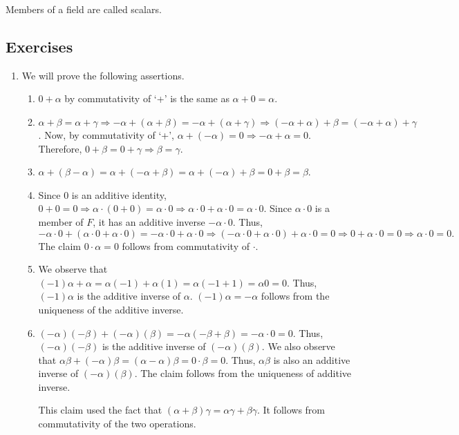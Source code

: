 \begin{rem}
Members of a field are called scalars.
\end{rem}

\subsection{Exercises}
\begin{enumerate}
\item We will prove the following assertions.
\begin{enumerate}
\item $0 + \alpha$ by commutativity of `+' is the same as $\alpha + 0
= \alpha$.
\item $\alpha + \beta = \alpha + \gamma \Rightarrow -\alpha + (\alpha
+ \beta) = -\alpha + (\alpha + \gamma) \Rightarrow (-\alpha + \alpha)
+ \beta = (-\alpha + \alpha) + \gamma$. Now, by commutativity of `+',
$\alpha + (-\alpha) = 0 \Rightarrow -\alpha + \alpha = 0$. Therefore,
$0 + \beta = 0 + \gamma \Rightarrow \beta = \gamma$.
\item $\alpha + (\beta - \alpha) = \alpha + (-\alpha + \beta) = 
\alpha + (-\alpha) + \beta = 0 + \beta = \beta$.
\item Since $0$ is an additive identity, $0 + 0 = 0 \Rightarrow
\alpha\cdot(0 + 0) = \alpha\cdot 0 \Rightarrow \alpha\cdot 0 + 
\alpha\cdot 0 = \alpha\cdot 0$. Since $\alpha\cdot 0$ is a member of
$F$, it has an additive inverse $-\alpha\cdot 0$. Thus,
$-\alpha\cdot 0 + (\alpha\cdot 0 + \alpha\cdot 0) = 
-\alpha\cdot 0 + \alpha\cdot 0 \Rightarrow
(-\alpha\cdot 0 + \alpha\cdot 0) + \alpha\cdot 0 = 0 \Rightarrow
0 + \alpha\cdot 0 = 0 \Rightarrow \alpha\cdot 0 = 0.$
The claim $0\cdot\alpha = 0$ follows from commutativity of $\cdot$.
\item We observe that $(-1)\alpha + \alpha = \alpha(-1) + \alpha(1)
= \alpha(-1 + 1) = \alpha 0 = 0$. Thus, $(-1)\alpha$ is the additive
inverse of $\alpha$. $(-1)\alpha = -\alpha$ follows from the
uniqueness of the additive inverse.
\item $(-\alpha)(-\beta) + (-\alpha)(\beta) = -\alpha(-\beta + \beta)
= -\alpha \cdot 0 = 0$. Thus, $(-\alpha)(-\beta)$ is the additive 
inverse of $(-\alpha)(\beta)$. We also observe that $\alpha\beta + 
(-\alpha)\beta = (\alpha - \alpha)\beta = 0\cdot\beta = 0$. Thus,
$\alpha\beta$ is also an additive inverse of $(-\alpha)(\beta)$. The
claim follows from the uniqueness of additive inverse. 

This claim used the fact that $(\alpha + \beta)\gamma = \alpha\gamma
+ \beta\gamma$. It follows from commutativity of the two operations.


\end{enumerate}
\end{enumerate}

